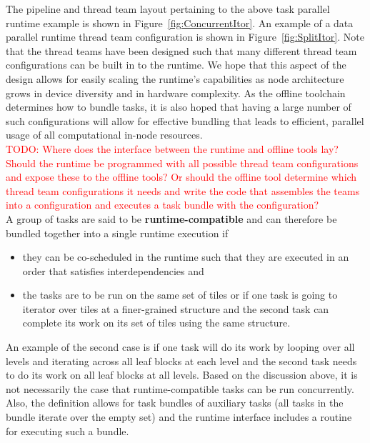 \documentclass{article}
\begin{document}
The pipeline and thread team layout pertaining to the above task parallel
runtime example is shown in Figure~\ref{fig:ConcurrentItor}.  An example of a data parallel
runtime thread team configuration is shown in Figure~\ref{fig:SplitItor}.  Note that the
thread teams have been designed such that many different thread team
configurations can be built in to the runtime.  We hope that this aspect of the
design allows for easily scaling the runtime's capabilities as node architecture
grows in device diversity and in hardware complexity.  As the offline toolchain
determines how to bundle tasks, it is also hoped that having a large number of
such configurations will allow for effective bundling that leads to efficient,
parallel usage of all computational in-node resources.\\

\textcolor{red}{TODO: Where does the interface between the runtime and offline
tools lay?  Should the runtime be programmed with all possible thread team
configurations and expose these to the offline tools?  Or should the offline
tool determine which thread team configurations it needs and write the code
that assembles the teams into a configuration and executes a task bundle with
the configuration?}\\

A group of tasks are said to be \textbf{runtime-compatible} and can therefore be
bundled together into a single runtime execution if
\begin{itemize}
\item{they can be co-scheduled in the runtime such that they are executed in an
order that satisfies interdependencies and}
\item{the tasks are to be run on the same set of tiles or if one task is going
to iterator over tiles at a finer-grained structure and the second task can
complete its work on its set of tiles using the same structure.}
\end{itemize}
An example of the second case is if one task
will do its work by looping over all levels and iterating across all leaf blocks
at each level and the second task needs to do its work on all leaf blocks at all
levels.  Based on the discussion above, it is not necessarily the case that
runtime-compatible tasks can be run concurrently.  Also, the definition allows
for task bundles of auxiliary tasks (all tasks in the bundle iterate over the
empty set) and the runtime interface includes a routine for executing such a
bundle.\\
\end{document}
